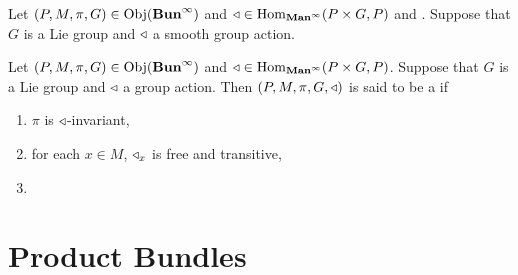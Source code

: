 \documentclass{book}
\begin{document}
	\begin{defn}
		Let $(P, M, \pi, G) \in \operatorname{Obj}(\operatorname*{\text{\textbf{Bun}}^{\infty}})$ and $\triangleleft \in \operatorname{Hom}_{\operatorname*{\text{\textbf{Man}}^{\infty}}}(P \times G, P)$ and . Suppose that $G$ is a Lie group and $\triangleleft$ a smooth group action.
	\end{defn}

	
	\begin{defn}
		Let $(P, M, \pi, G) \in \operatorname{Obj}(\operatorname*{\text{\textbf{Bun}}^{\infty}})$ and $\triangleleft \in \operatorname{Hom}_{\operatorname*{\text{\textbf{Man}}^{\infty}}}(P \times G, P)$. Suppose that $G$ is a Lie group and $\triangleleft$ a group action. Then $(P, M, \pi, G, \triangleleft)$ is said to be a  if 
		\begin{enumerate}
			\item $\pi$ is $\triangleleft$-invariant,
			\item for each $x \in M$, $\triangleleft_x$ is free and transitive,
			\item 
		\end{enumerate}
	\end{defn}


	
	
	
	
	
	
	
	
	
	
	
	
	
	
	
	
	
	
	
	
	
	
	
	
	
	
	
	
	
	
	
		\newpage
	\section{Product Bundles}
	
	\begin{defn}
		
	\end{defn}
	
	
	
	
	
	
	
	
	
	
	
	
	
	
	
	
	
	
	
	
	
\end{document}
